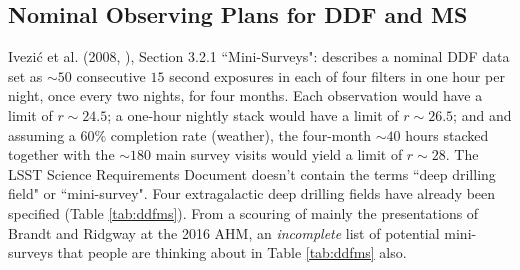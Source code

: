 \documentclass[DM,lsstdraft,toc]{lsstdoc}
\begin{document}
\subsection{Nominal Observing Plans for DDF and MS}\label{ssec:science_plans}

Ivezi\'{c} et al. (2008, \cite{2008arXiv0805.2366I}), Section 3.2.1 ``Mini-Surveys": describes a nominal DDF data set as $\sim50$ consecutive $15$ second exposures in each of four filters in one hour per night, once every two nights, for four months. Each observation would have a limit of $r\sim24.5$; a one-hour nightly stack would have a limit of $r\sim26.5$; and and assuming a $60\%$ completion rate (weather), the four-month $\sim40$ hours stacked together with the $\sim180$ main survey visits would yield a limit of $r\sim28$. The LSST Science Requirements Document \cite{LPM-17} doesn't contain the terms ``deep drilling field" or ``mini-survey". Four extragalactic deep drilling fields have already been specified (Table \ref{tab:ddfms}). From a scouring of mainly the presentations of Brandt and Ridgway at the 2016 AHM, an {\it incomplete} list of potential mini-surveys that people are thinking about in Table \ref{tab:ddfms} also.
\end{document}

